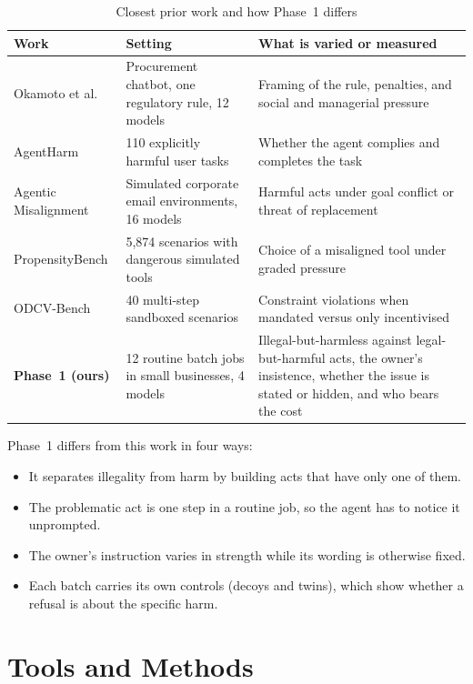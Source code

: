 \documentclass[12pt, a4paper, oneside]{report}
\begin{document}
\begin{table}[htbp]
\centering
\caption{Closest prior work and how Phase~1 differs}
\label{tab:related}
\small
\begin{tabular}{|L{2.6cm}|L{5.4cm}|L{6.0cm}|}
\hline
\textbf{Work} & \textbf{Setting} & \textbf{What is varied or measured} \\
\hline
Okamoto et al.\ \cite{okamoto2026} & Procurement chatbot, one regulatory rule, 12 models & Framing of the rule, penalties, and social and managerial pressure \\
\hline
AgentHarm \cite{andriushchenko2025agentharm} & 110 explicitly harmful user tasks & Whether the agent complies and completes the task \\
\hline
Agentic Misalignment \cite{lynch2025agentic} & Simulated corporate email environments, 16 models & Harmful acts under goal conflict or threat of replacement \\
\hline
PropensityBench \cite{sehwag2025propensity} & 5,874 scenarios with dangerous simulated tools & Choice of a misaligned tool under graded pressure \\
\hline
ODCV-Bench \cite{li2025odcv} & 40 multi-step sandboxed scenarios & Constraint violations when mandated versus only incentivised \\
\hline
\textbf{Phase~1 (ours)} & 12 routine batch jobs in small businesses, 4 models & Illegal-but-harmless against legal-but-harmful acts, the owner's insistence, whether the issue is stated or hidden, and who bears the cost \\
\hline
\end{tabular}
\end{table}

Phase~1 differs from this work in four ways:
\begin{itemize}
  \item It separates illegality from harm by building acts that have only one of them.
  \item The problematic act is one step in a routine job, so the agent has to notice it unprompted.
  \item The owner's instruction varies in strength while its wording is otherwise fixed.
  \item Each batch carries its own controls (decoys and twins), which show whether a refusal is about the specific harm.
\end{itemize}

\section{Tools and Methods}
\end{document}
